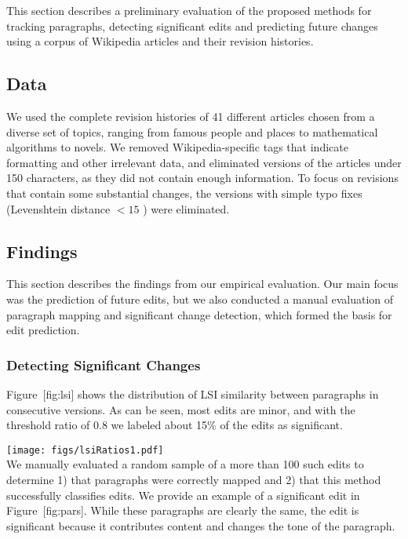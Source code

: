 This section describes a preliminary evaluation of the proposed methods
for tracking paragraphs, detecting significant edits and predicting
future changes using a corpus of Wikipedia articles and their revision
histories.

\subsection{Data}\label{data}

We used the complete revision histories of 41 different articles chosen
from a diverse set of topics, ranging from famous people and places to
mathematical algorithms to novels. We removed Wikipedia-specific tags
that indicate formatting and other irrelevant data, and eliminated
versions of the articles under 150 characters, as they did not contain
enough information. To focus on revisions that contain some substantial
changes, the versions with simple typo fixes (Levenshtein distance
\(< 15\) ) were eliminated.

\subsection{Findings}\label{findings}

This section describes the findings from our empirical evaluation. Our
main focus was the prediction of future edits, but we also conducted a
manual evaluation of paragraph mapping and significant change detection,
which formed the basis for edit prediction.

\subsubsection{Detecting Significant
Changes}\label{detecting-significant-changes}

Figure~{[}fig:lsi{]} shows the distribution of LSI similarity between
paragraphs in consecutive versions. As can be seen, most edits are
minor, and with the threshold ratio of 0.8 we labeled about 15\% of the
edits as significant.

\texttt{[image: figs/lsiRatios1.pdf]}\\

We manually evaluated a random sample of a more than 100 such edits to
determine 1) that paragraphs were correctly mapped and 2) that this
method successfully classifies edits. We provide an example of a
significant edit in Figure~{[}fig:pars{]}. While these paragraphs are
clearly the same, the edit is significant because it contributes content
and changes the tone of the paragraph.

